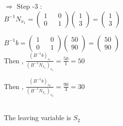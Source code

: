 \documentclass{beamer}
\begin{document}
\begin{frame}
$\Rightarrow$ Step -3 : \\
\vspace{0.4cm}
$ B^{-1}N_{x_1} = \begin{pmatrix}
1 && 0   \\
0 && 1  
\end{pmatrix} \begin{pmatrix}
1    \\
3  
\end{pmatrix} = \begin{pmatrix}
1   \\
3  
\end{pmatrix}$    

\vspace{0.4cm}
$ B^{-1}b = \begin{pmatrix}
1 && 0   \\
0 && 1  
\end{pmatrix} \begin{pmatrix}
50   \\
90 
\end{pmatrix} = \begin{pmatrix}
50   \\
90 
\end{pmatrix}$ \\
\vspace{0.4cm} 
Then , $ \frac{(B^{-1}b)_{s_1}}{(B^{-1}N_{x_1})_{s_1}  }   = \frac{50}{1} = 50  $

\vspace{0.4cm} 
Then , $ \frac{(B^{-1}b)_{s_2}}{(B^{-1}N_{x_1})_{s_2}  }   = \frac{90}{3} = 30  $

\vspace{0.8cm} 
\\ The leaving variable is $S_2  $

\end{frame}
\end{document}

